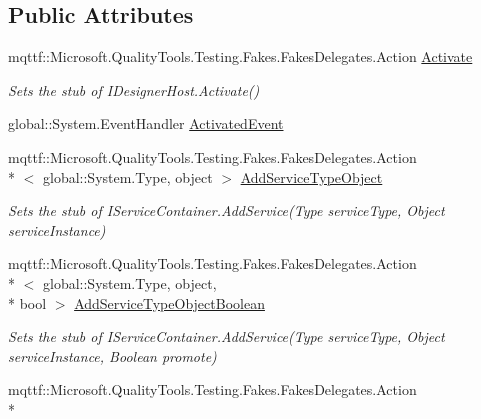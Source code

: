\subsection*{Public Attributes}
\begin{DoxyCompactItemize}
\item 
mqttf\-::\-Microsoft.\-Quality\-Tools.\-Testing.\-Fakes.\-Fakes\-Delegates.\-Action \hyperlink{class_system_1_1_component_model_1_1_design_1_1_serialization_1_1_fakes_1_1_stub_i_designer_loader_host2_a50762187b5bedd3e93014e3b0513585a}{Activate}
\begin{DoxyCompactList}\small\item\em Sets the stub of I\-Designer\-Host.\-Activate()\end{DoxyCompactList}\item 
global\-::\-System.\-Event\-Handler \hyperlink{class_system_1_1_component_model_1_1_design_1_1_serialization_1_1_fakes_1_1_stub_i_designer_loader_host2_a6caf810e4247e8e6ee971af179e1d958}{Activated\-Event}
\item 
mqttf\-::\-Microsoft.\-Quality\-Tools.\-Testing.\-Fakes.\-Fakes\-Delegates.\-Action\\*
$<$ global\-::\-System.\-Type, object $>$ \hyperlink{class_system_1_1_component_model_1_1_design_1_1_serialization_1_1_fakes_1_1_stub_i_designer_loader_host2_a872ecbadc10481d05eb4e69bd6b2bfd5}{Add\-Service\-Type\-Object}
\begin{DoxyCompactList}\small\item\em Sets the stub of I\-Service\-Container.\-Add\-Service(\-Type service\-Type, Object service\-Instance)\end{DoxyCompactList}\item 
mqttf\-::\-Microsoft.\-Quality\-Tools.\-Testing.\-Fakes.\-Fakes\-Delegates.\-Action\\*
$<$ global\-::\-System.\-Type, object, \\*
bool $>$ \hyperlink{class_system_1_1_component_model_1_1_design_1_1_serialization_1_1_fakes_1_1_stub_i_designer_loader_host2_ab36372b012691375ff14b2d6311856db}{Add\-Service\-Type\-Object\-Boolean}
\begin{DoxyCompactList}\small\item\em Sets the stub of I\-Service\-Container.\-Add\-Service(\-Type service\-Type, Object service\-Instance, Boolean promote)\end{DoxyCompactList}\item 
mqttf\-::\-Microsoft.\-Quality\-Tools.\-Testing.\-Fakes.\-Fakes\-Delegates.\-Action\\*

\end{DoxyCompactItemize}
